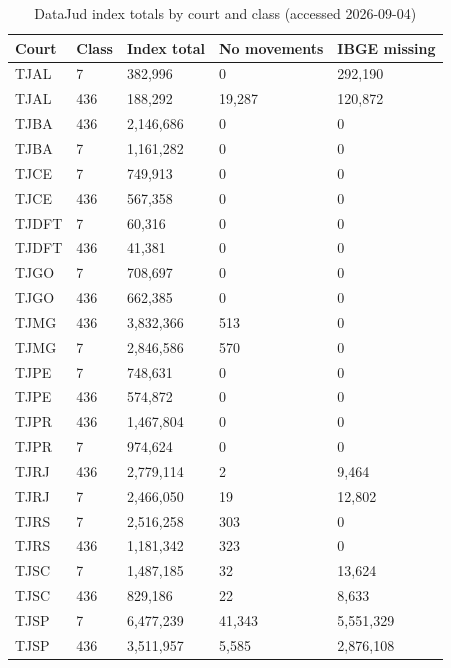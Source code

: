 \begin{table}[htbp]\centering
\caption{DataJud index totals by court and class (accessed 2026-09-04)}\label{tab:coverage}
\begin{tabular}{lllll}
\toprule
Court & Class & Index total & No movements & IBGE missing
\\ \midrule
TJAL & 7 & 382,996 & 0 & 292,190 \\
TJAL & 436 & 188,292 & 19,287 & 120,872 \\
TJBA & 436 & 2,146,686 & 0 & 0 \\
TJBA & 7 & 1,161,282 & 0 & 0 \\
TJCE & 7 & 749,913 & 0 & 0 \\
TJCE & 436 & 567,358 & 0 & 0 \\
TJDFT & 7 & 60,316 & 0 & 0 \\
TJDFT & 436 & 41,381 & 0 & 0 \\
TJGO & 7 & 708,697 & 0 & 0 \\
TJGO & 436 & 662,385 & 0 & 0 \\
TJMG & 436 & 3,832,366 & 513 & 0 \\
TJMG & 7 & 2,846,586 & 570 & 0 \\
TJPE & 7 & 748,631 & 0 & 0 \\
TJPE & 436 & 574,872 & 0 & 0 \\
TJPR & 436 & 1,467,804 & 0 & 0 \\
TJPR & 7 & 974,624 & 0 & 0 \\
TJRJ & 436 & 2,779,114 & 2 & 9,464 \\
TJRJ & 7 & 2,466,050 & 19 & 12,802 \\
TJRS & 7 & 2,516,258 & 303 & 0 \\
TJRS & 436 & 1,181,342 & 323 & 0 \\
TJSC & 7 & 1,487,185 & 32 & 13,624 \\
TJSC & 436 & 829,186 & 22 & 8,633 \\
TJSP & 7 & 6,477,239 & 41,343 & 5,551,329 \\
TJSP & 436 & 3,511,957 & 5,585 & 2,876,108 \\
\bottomrule
\end{tabular}\end{table}
